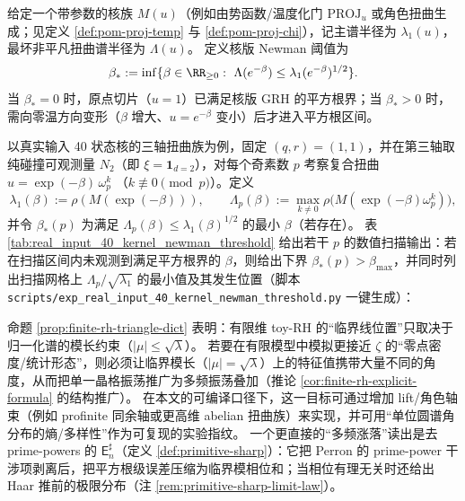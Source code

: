 \begin{definition}\label{def:kernel-newman-threshold}
给定一个带参数的核族 \(M(u)\)（例如由势函数/温度化门 \(\mathrm{PROJ}_u\) 或角色扭曲生成；见定义 \ref{def:pom-proj-temp} 与 \ref{def:pom-proj-chi}），记主谱半径为 \(\lambda_1(u)\)，最坏非平凡扭曲谱半径为 \(\Lambda(u)\)。
定义核版 Newman 阈值为
\[
\beta_\ast:=\inf\{\beta\in\RR_{\ge 0}:\ \Lambda(e^{-\beta})\le \lambda_1(e^{-\beta})^{1/2}\}.
\]
当 \(\beta_\ast=0\) 时，原点切片（\(u=1\)）已满足核版 GRH 的平方根界；当 \(\beta_\ast>0\) 时，需向零温方向变形（\(\beta\) 增大、\(u=e^{-\beta}\) 变小）后才进入平方根区间。
\end{definition}

\begin{remark}\label{rem:kernel-newman-threshold-repro}
以真实输入 40 状态核的三轴扭曲族为例，固定 \((q,r)=(1,1)\)，并在第三轴取纯碰撞可观测量 \(N_2\)（即 \(\xi=\mathbf{1}_{d=2}\)），对每个奇素数 \(p\) 考察复合扭曲
\(
u=\exp(-\beta)\,\omega_p^k
\)
（\(k\not\equiv 0\!\!\pmod p\)）。定义
\[
\lambda_1(\beta):=\rho(M(\exp(-\beta))),\qquad
\Lambda_p(\beta):=\max_{k\neq 0}\rho\bigl(M(\exp(-\beta)\omega_p^k)\bigr),
\]
并令 \(\beta_\ast(p)\) 为满足 \(\Lambda_p(\beta)\le \lambda_1(\beta)^{1/2}\) 的最小 \(\beta\)（若存在）。
表 \ref{tab:real_input_40_kernel_newman_threshold} 给出若干 \(p\) 的数值扫描输出：若在扫描区间内未观测到满足平方根界的 \(\beta\)，则给出下界 \(\beta_\ast(p)>\beta_{\max}\)，并同时列出扫描网格上 \(\Lambda_p/\sqrt{\lambda_1}\) 的最小值及其发生位置（脚本 \texttt{scripts/exp\_real\_input\_40\_kernel\_newman\_threshold.py} 一键生成）：

\end{remark}

\begin{remark}\label{rem:finite-rh-angle-entropy}
命题 \ref{prop:finite-rh-triangle-dict} 表明：有限维 toy-RH 的“临界线位置”只取决于归一化谱的模长约束（\( |\mu|\le \sqrt\lambda \)）。
若要在有限模型中模拟更接近 \(\zeta\) 的“零点密度/统计形态”，则必须让临界模长（\(|\mu|=\sqrt\lambda\)）上的特征值携带大量不同的角度，从而把单一晶格振荡推广为多频振荡叠加（推论 \ref{cor:finite-rh-explicit-formula} 的结构推广）。
在本文的可编译口径下，这一目标可通过增加 lift/角色轴束（例如 profinite 同余轴或更高维 abelian 扭曲族）来实现，并可用“单位圆谱角分布的熵/多样性”作为可复现的实验指纹。
一个更直接的“多频涨落”读出是去 prime-powers 的 \(\mathsf{E}_n^\sharp\)（定义 \ref{def:primitive-sharp}）：它把 Perron 的 prime-power 干涉项剥离后，把平方根级误差压缩为临界模相位和；当相位有理无关时还给出 Haar 推前的极限分布（注 \ref{rem:primitive-sharp-limit-law}）。
\end{remark}

